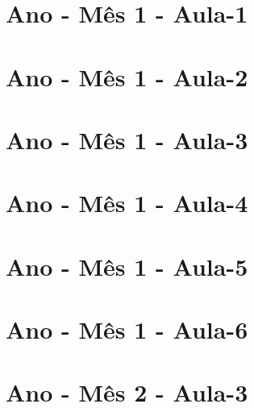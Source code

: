 
\pagebreak

\ClearWallPaper

\begin{multicols}{2}
	
	\section[\sffamily 1\textordmasculine\space Ano - M\^{e}s 1 - Aula-1]{\textordmasculine\space Ano - M\^{e}s 1 - Aula-1}


\section[\sffamily 1\textordmasculine\space Ano - M\^{e}s 1 - Aula-2]{\textordmasculine\space Ano - M\^{e}s 1 - Aula-2}


\section[\sffamily 1\textordmasculine\space Ano - M\^{e}s 1 - Aula-3]{\textordmasculine\space Ano - M\^{e}s 1 - Aula-3}


\section[\sffamily 1\textordmasculine\space Ano - M\^{e}s 1 - Aula-4]{\textordmasculine\space Ano - M\^{e}s 1 - Aula-4}


\section[\sffamily 1\textordmasculine\space Ano - M\^{e}s 1 - Aula-5]{\textordmasculine\space Ano - M\^{e}s 1 - Aula-5}


\section[\sffamily 1\textordmasculine\space Ano - M\^{e}s 1 - Aula-6]{\textordmasculine\space Ano - M\^{e}s 1 - Aula-6}


\section[\sffamily 1\textordmasculine\space Ano - M\^{e}s 2 - Aula-3]{\textordmasculine\space Ano - M\^{e}s 2 - Aula-3}



\end{multicols}
